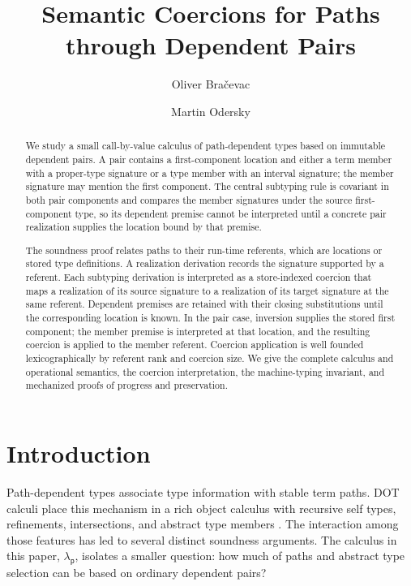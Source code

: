 \documentclass[acmsmall,screen,nonacm]{acmart}
\title{Semantic Coercions for Paths through Dependent Pairs}
\author{Oliver Bra\v{c}evac}
\author{Martin Odersky}
\newcommand{\lambdap}{\ensuremath{\lambda_{\mathsf p}}}
\begin{document}
\begin{abstract}
We study a small call-by-value calculus of path-dependent types based on
immutable dependent pairs. A pair contains a first-component location and
either a term member with a proper-type signature or a type member with an
interval signature; the member signature may mention the first component.
The central subtyping rule is covariant in both pair components and compares
the member signatures under the source first-component type, so its dependent
premise cannot be interpreted until a concrete pair realization supplies the
location bound by that premise.

The soundness proof relates paths to their run-time referents, which are
locations or stored type definitions. A realization derivation records the
signature supported by a referent. Each subtyping derivation is interpreted
as a store-indexed coercion that maps a realization of its source signature
to a realization of its target signature at the same referent. Dependent
premises are retained with their closing substitutions until the corresponding
location is known. In the pair case, inversion supplies the stored first
component; the member premise is interpreted at that location, and the
resulting coercion is applied to the member referent. Coercion application is
well founded lexicographically by referent rank and coercion size. We give the
complete calculus and operational semantics, the coercion interpretation, the
machine-typing invariant, and mechanized proofs of progress and preservation.
\end{abstract}


\maketitle

\section{Introduction}

Path-dependent types associate type information with stable term paths. DOT
calculi place this mechanism in a rich object calculus with recursive self
types, refinements, intersections, and abstract type members
\citep{amin2014foundations,rompf2016dot}. The interaction among those
features has led to several distinct soundness arguments. The calculus in
this paper, \lambdap{}, isolates a smaller question: how much of paths and
abstract type selection can be based on ordinary dependent pairs?
\end{document}
